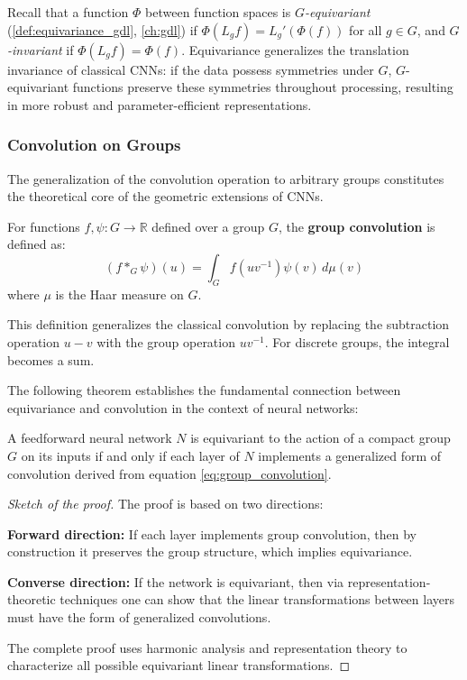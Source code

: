 Recall that a function $\Phi$ between function spaces is \textit{$G$-equivariant} (\autoref{def:equivariance_gdl}, \autoref{ch:gdl}) if $\Phi(L_g f) = L_g' (\Phi(f))$ for all $g \in G$, and \textit{$G$-invariant} if $\Phi(L_g f) = \Phi(f)$. Equivariance generalizes the translation invariance of classical \glspl{CNN}: if the data possess symmetries under $G$, $G$-equivariant functions preserve these symmetries throughout processing, resulting in more robust and parameter-efficient representations.

\subsubsection{Convolution on Groups}

The generalization of the convolution operation to arbitrary groups constitutes the theoretical core of the geometric extensions of \glspl{CNN}.

\begin{definition}
For functions $f, \psi: G \to \mathbb{R}$ defined over a group $G$, the \textbf{group convolution} is defined as:
\begin{equation}
(f *_G \psi)(u) = \int_G f(uv^{-1}) \psi(v) \, d\mu(v)
\label{eq:group_convolution}
\end{equation}
where $\mu$ is the Haar measure on $G$.
\end{definition}

This definition generalizes the classical convolution by replacing the subtraction operation $u - v$ with the group operation $uv^{-1}$. For discrete groups, the integral becomes a sum.

The following theorem establishes the fundamental connection between equivariance and convolution in the context of neural networks:

\begin{theorem}
A feedforward neural network $N$ is equivariant to the action of a compact group $G$ on its inputs if and only if each layer of $N$ implements a generalized form of convolution derived from equation \ref{eq:group_convolution}.
\end{theorem}

\begin{proof}[Sketch of the proof]
The proof is based on two directions:

\textbf{Forward direction:} If each layer implements group convolution, then by construction it preserves the group structure, which implies equivariance.

\textbf{Converse direction:} If the network is equivariant, then via representation-theoretic techniques one can show that the linear transformations between layers must have the form of generalized convolutions.

The complete proof uses harmonic analysis and representation theory to characterize all possible equivariant linear transformations.
\end{proof}

